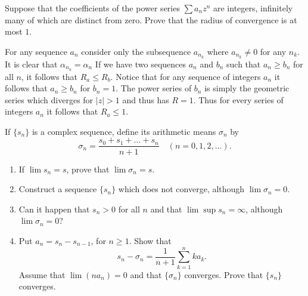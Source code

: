 \begin{problem}
  Suppose that the coefficients of the power series $\sum a_n z^n$ are integers, infinitely many of which are distinct from zero.
  Prove that the radius of convergence is at most $1$.
\end{problem}

\begin{solution}
  For any sequence $a_n$ consider only the subsequence $a_{n_k}$ where $a_{n_k} \neq 0$ for any $n_k$.
  It is clear that $\alpha_{n_k} = \alpha_{n}$
  If we have two sequences $a_n$ and $b_n$ such that $a_n \ge b_n$ for all $n$, it follows that $R_a \le R_b$.
  Notice that for any sequence of integers $a_n$ it follows that $a_n \ge b_n$ for $b_n = 1$.
  The power series of $b_n$ is simply the geometric series which diverges for $|z| > 1$ and thus has $R = 1$.
  Thus for every series of integers $a_n$ it follows that $R_a \le 1$.
\end{solution}

\setcounter{problem}{13}
\begin{problem}
  If $\{s_n\}$ is a complex sequence, define its arithmetic means $\sigma_n$ by
  \[\sigma_n = \frac{s_0 + s_1 + \ldots + s_n}{n + 1} \quad (n = 0, 1, 2, \ldots).\]
  \begin{enumerate}[label=(\alph*)]
    \item If $\lim s_n = s$, prove that $\lim \sigma_n = s$.
    \item Construct a sequence $\{s_n\}$ which does not converge, although $\lim \sigma_n = 0$.
    \item Can it happen that $s_n > 0$ for all $n$ and that $\lim\sup s_n = \infty$, although $\lim \sigma_n = 0$?
    \item Put $a_n = s_n - s_{n-1}$, for $n \ge 1$.
      Show that
      \[s_n - \sigma_n = \frac{1}{n + 1} \sum_{k = 1}^{n} k a_k .\]
      Assume that $\lim (na_n) = 0$ and that $\{\sigma_n\}$ converges.
      Prove that $\{s_n\}$ converges.
  \end{enumerate}
\end{problem}

